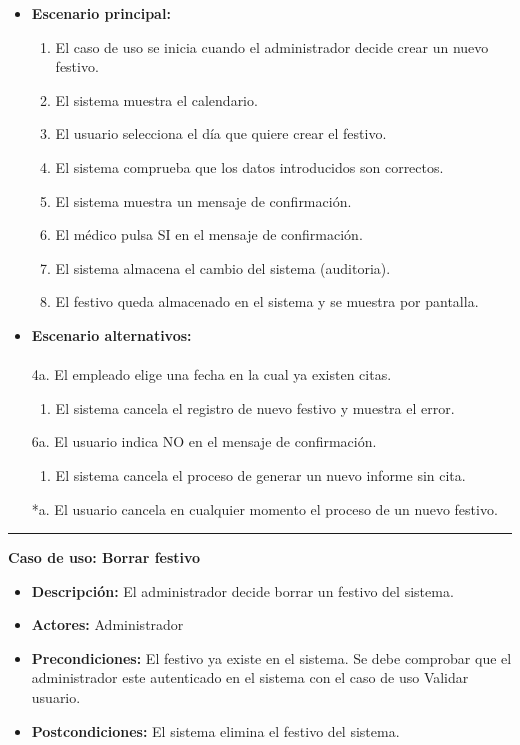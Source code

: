 \begin{itemize}\renewcommand{\labelitemi}{$\circ$}
 \item \textbf{Escenario principal:}
         \begin{enumerate}
          \item El caso de uso se inicia cuando el administrador decide crear un nuevo festivo.
	  \item El sistema muestra el calendario.
          \item El usuario selecciona el día que quiere crear el festivo.
          \item El sistema comprueba que los datos introducidos son correctos.
	  \item El sistema muestra un mensaje de confirmación.
          \item El médico pulsa SI en el mensaje de confirmación.
 	  \item El sistema almacena el cambio del sistema (auditoria).
          \item El festivo queda almacenado en el sistema y se muestra por pantalla.
         \end{enumerate}
  \item \textbf{Escenario alternativos:}\\\\
	4a. El empleado elige una fecha en la cual ya existen citas.
  			\begin{enumerate}
  			\item El sistema cancela el registro de nuevo festivo y muestra el error.
  			\end{enumerate}
	6a. El usuario indica NO en el mensaje de confirmación.
  			\begin{enumerate}
  			\item El sistema cancela el proceso de generar un nuevo informe sin cita.
  			\end{enumerate}
          *a. El usuario cancela en cualquier momento el proceso de un nuevo festivo.
\end{itemize}
\smallskip
\hrule height 1pt
\smallskip
\textbf{Caso de uso: Borrar festivo}
\begin{itemize}\renewcommand{\labelitemi}{$\cdot$}
 \item \textbf{Descripción:} El administrador decide borrar un festivo del sistema.
  \item \textbf{Actores:} Administrador
  \item \textbf{Precondiciones:} El festivo ya existe en el sistema. Se debe comprobar que el administrador este autenticado en el sistema con el caso de uso Validar usuario.
  \item \textbf{Postcondiciones:} El sistema elimina el festivo del sistema.
\end{itemize}
